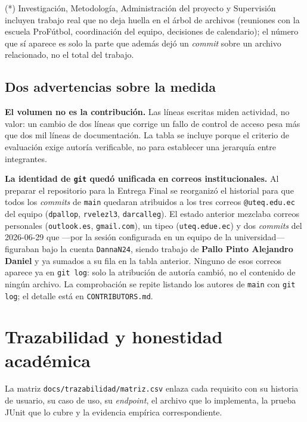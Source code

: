 \documentclass[11pt,a4paper]{article}
\newcommand{\ruta}[1]{\texttt{\footnotesize #1}}
\begin{document}
\noindent\small(*) Investigación, Metodología, Administración del proyecto
y Supervisión incluyen trabajo real que no deja huella en el árbol de
archivos (reuniones con la escuela ProFútbol, coordinación del equipo,
decisiones de calendario); el número que sí aparece es solo la parte que
además dejó un \emph{commit} sobre un archivo relacionado, no el total del
trabajo.\normalsize

\subsection{Dos advertencias sobre la medida}

\textbf{El volumen no es la contribución.} Las líneas escritas miden
actividad, no valor: un cambio de dos líneas que corrige un fallo de
control de acceso pesa más que dos mil líneas de documentación. La tabla
se incluye porque el criterio de evaluación exige autoría verificable, no
para establecer una jerarquía entre integrantes.

\textbf{La identidad de \texttt{git} quedó unificada en correos
institucionales.} Al preparar el repositorio para la Entrega Final se
reorganizó el historial para que todos los \emph{commits} de \texttt{main}
quedaran atribuidos a los tres correos \texttt{@uteq.edu.ec} del equipo
(\texttt{dpallop}, \texttt{rvelezl3}, \texttt{darcalleg}). El estado
anterior mezclaba correos personales (\texttt{outlook.es},
\texttt{gmail.com}), un tipeo (\texttt{uteq.edue.ec}) y dos \emph{commits}
del 2026-06-29 que —por la sesión configurada en un equipo de la
universidad— figuraban bajo la cuenta \texttt{DannaN24}, siendo trabajo de
\textbf{Pallo Pinto Alejandro Daniel} y ya sumados a su fila en la tabla
anterior. Ninguno de esos correos aparece ya en \texttt{git log}: solo la
atribución de autoría cambió, no el contenido de ningún archivo. La
comprobación se repite listando los autores de \texttt{main} con
\texttt{git log}; el detalle está en \ruta{CONTRIBUTORS.md}.

\section{Trazabilidad y honestidad académica}

La matriz \ruta{docs/trazabilidad/matriz.csv} enlaza cada requisito con su
historia de usuario, su caso de uso, su \emph{endpoint}, el archivo que lo
implementa, la prueba JUnit que lo cubre y la evidencia empírica
correspondiente.
\end{document}
